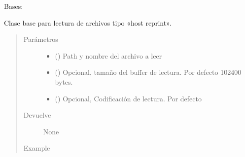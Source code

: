 \documentclass[a4paper,12pt,spanish]{sphinxmanual}
\begin{document}
\begin{fulllineitems}
\label{\detokenize{openerm.SpoolHostReprint:openerm.SpoolHostReprint.SpoolHostReprint}}
Bases: 

Clase base para lectura de archivos tipo «host reprint».
\begin{quote}\begin{description}
\item[{Parámetros}] \leavevmode\begin{itemize}
\item {} 
 () \textendash{} Path y nombre del archivo a leer

\item {} 
 () \textendash{} Opcional, tamaño del buffer de lectura.
Por defecto 102400 bytes.

\item {} 
 () \textendash{} Opcional, Codificación de lectura. Por defecto 

\end{itemize}

\item[{Devuelve}] \leavevmode
None

\item[{Example}] \leavevmode
\begin{sphinxVerbatim}[commandchars=\\\{\}]
   
    
               
                    
\end{sphinxVerbatim}

\end{description}\end{quote}

\end{fulllineitems}
\end{document}
